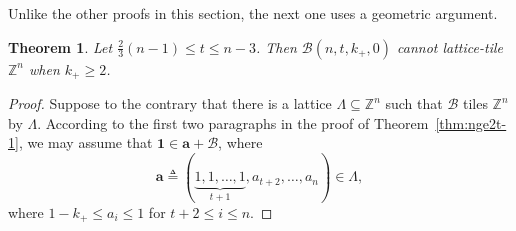 \documentclass[sort&compress]{elsarticle}
\newcommand{\cB}{\mathcal{B}}
\renewcommand{\leq}{\leqslant}
\renewcommand{\geq}{\geqslant}
\newtheorem{theorem}{Theorem}
\newcommand{\Z}{\mathbb{Z}}
\newcommand{\va}{\mathbf{a}}
\newcommand{\One}{{\mathbf{1}}}
\newcommand{\kp}{k_+}
\newcommand{\eqdef}{\triangleq}
\begin{document}
   Unlike the other proofs in this section, the next one uses a
   geometric argument.
   
\begin{theorem}
Let $\frac{2}{3}(n-1)\leq t \leq n-3$. Then $\cB(n,t,\kp,0)$ cannot
lattice-tile $\Z^n$ when $\kp\geq 2$.
\end{theorem}

\begin{proof}
  Suppose to the contrary that there is a lattice $\Lambda\subseteq
  \Z^n$ such that $\cB$ tiles $\Z^n$ by $\Lambda$.    According to the first
  two paragraphs in the proof of Theorem~\ref{thm:nge2t-1}, we may
  assume that $\One \in \va+\cB$, where
  \[\va\eqdef (\underbrace{1,1,\ldots,1}_{t+1}, a_{t+2},\ldots,a_n)   \in \Lambda,\]
  where $1-\kp\leq a_i \leq 1$ for $t+2 \leq i \leq n$. 


\end{proof}
\end{document}
